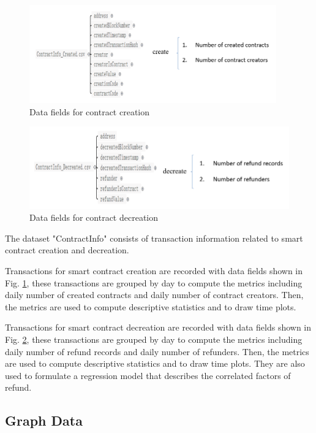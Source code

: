 \begin{figure}[htb]
	\includegraphics[width=0.95\textwidth]{gfx/statistical1.png}
	\caption{Data fields for contract creation}
	\label{fig:statistical1}
\end{figure}

\begin{figure}[htb]
	\includegraphics[width=\textwidth]{gfx/statistical2.png}
	\caption{Data fields for contract decreation}
	\label{fig:statistical2}
\end{figure}

The dataset "ContractInfo" consists of transaction information related to smart contract creation and decreation.

Transactions for smart contract creation are recorded with data fields shown in Fig. \ref{fig:statistical1}, these transactions are grouped by day to compute the metrics including daily number of created contracts and daily number of contract creators. Then, the metrics are used to compute descriptive statistics and to draw time plots.

Transactions for smart contract decreation are recorded with data fields shown in Fig. \ref{fig:statistical2}, these transactions are grouped by day to compute the metrics including daily number of refund records and daily number of refunders. Then, the metrics are used to compute descriptive statistics and to draw time plots. They are also used to formulate a regression model that describes the correlated factors of refund.

\subsection{Graph Data}
\label{sec:methodology:data:graph}

